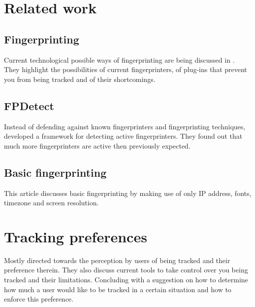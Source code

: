 \section{Related work}

\subsection{Fingerprinting}

Current technological possible ways of fingerprinting
are being discussed in \cite{nikiforakis2014workings}.
They highlight the possibilities of current fingerprinters,
of plug-ins that prevent you from being tracked
and of their shortcomings.

\subsection{FPDetect}

Instead of defending against known fingerprinters
and fingerprinting techniques,
\cite{acar2013fpdetective} developed a framework
for detecting active fingerprinters.
They found out
that much more fingerprinters are active then previously expected.

\subsection{Basic fingerprinting}

This article discusses basic fingerprinting
by making use of only IP address, fonts, timezone and screen resolution.
\cite{boda2011user}

\section{Tracking preferences}

Mostly directed towards the perception by users of being tracked
and their preference therein.
\cite{melicher2015(do}
They also discuss current tools to take control over you being tracked
and their limitations.
Concluding with a suggestion on how to determine
how much a user would like to be tracked in a certain situation
and how to enforce this preference.
